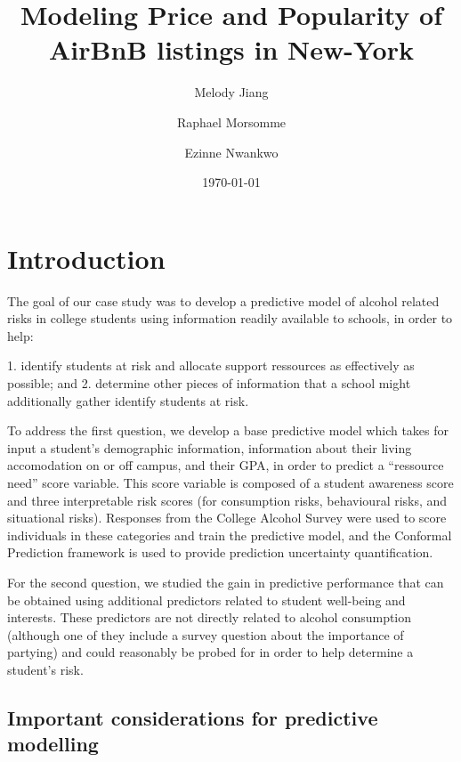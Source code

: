 \documentclass[10pt]{jmlr}%
\title[Modeling Price and Popularity of AirBnB listings in New-York]{Modeling Price and Popularity of AirBnB listings in New-York}	%
\author[Jiang, Morsomme, Nwankwo]{Melody Jiang \and Raphael Morsomme \and Ezinne Nwankwo}
\date{\today} %
\begin{document}
\maketitle

\begin{abstract}

\end{abstract}

\section{Introduction}
\label{sec:intro}



The goal of our case study was to develop a predictive model of alcohol related risks in college students using information readily available to schools, in order to help:

  1. identify students at risk and allocate support ressources as effectively as possible; and
  2. determine other pieces of information that a school might additionally gather identify students at risk.

To address the first question, we develop a base predictive model which takes for input a student's demographic information, information about their living accomodation on or off campus, and their GPA, in order to predict a ``ressource need'' score variable. This score variable is composed of a student awareness score and three interpretable risk scores (for consumption risks, behavioural risks, and situational risks). Responses from the College Alcohol Survey were used to score individuals in these categories and train the predictive model, and the Conformal Prediction framework is used to provide prediction uncertainty quantification.

For the second question, we studied the gain in predictive performance that can be obtained using additional predictors related to student well-being and interests. These predictors are not directly related to alcohol consumption (although one of they include a survey question about the importance of partying) and could reasonably be probed for in order to help determine a student's risk. 

\subsection{Important considerations for predictive modelling}
\end{document}
